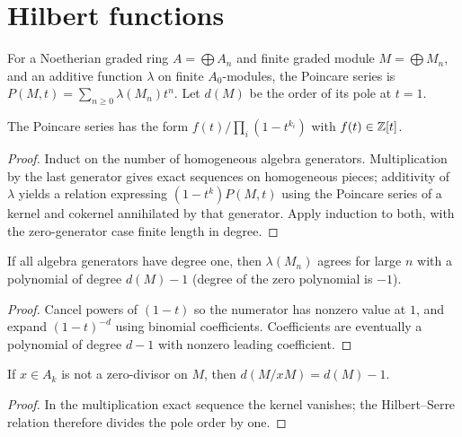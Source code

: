 \section{Hilbert functions}
\label{am-ch11-hilbert}
\begin{definition}
\label{am-def-poincare}
\uses{}
For a Noetherian graded ring $A=\bigoplus A_n$ and finite graded module
$M=\bigoplus M_n$, and an additive function $\lambda$ on finite $A_0$-modules,
the Poincare series is $P(M,t)=\sum_{n\ge0}\lambda(M_n)t^n$.  Let $d(M)$ be
the order of its pole at $t=1$.
\end{definition}
\begin{theorem}
\label{am-thm-11-1}
\uses{}
The Poincare series has the form
$f(t)/\prod_i(1-t^{k_i})$ with $f(t)\in\mathbb Z[t]$.
\end{theorem}
\begin{proof}
Induct on the number of homogeneous algebra generators.  Multiplication by the
last generator gives exact sequences on homogeneous pieces; additivity of
$\lambda$ yields a relation expressing $(1-t^{k})P(M,t)$ using the Poincare
series of a kernel and cokernel annihilated by that generator.  Apply induction
to both, with the zero-generator case finite length in degree.
\end{proof}
\begin{corollary}
\label{am-cor-11-2}
\uses{}
If all algebra generators have degree one, then $\lambda(M_n)$ agrees for large
$n$ with a polynomial of degree $d(M)-1$ (degree of the zero polynomial is
$-1$).
\end{corollary}
\begin{proof}
Cancel powers of $(1-t)$ so the numerator has nonzero value at $1$, and expand
$(1-t)^{-d}$ using binomial coefficients.  Coefficients are eventually a
polynomial of degree $d-1$ with nonzero leading coefficient.
\end{proof}
\begin{proposition}
\label{am-prop-11-3}
\uses{}
If $x\in A_k$ is not a zero-divisor on $M$, then
$d(M/xM)=d(M)-1$.
\end{proposition}
\begin{proof}
In the multiplication exact sequence the kernel vanishes; the Hilbert--Serre
relation therefore divides the pole order by one.
\end{proof}
